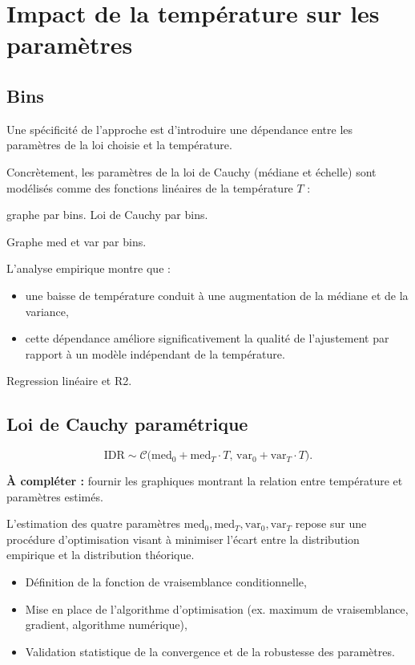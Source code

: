 \documentclass[11pt,a4paper,openright,twoside]{report}
\begin{document}
\section{Impact de la température sur les paramètres}
\subsection{Bins}
Une spécificité de l’approche est d’introduire une dépendance entre les paramètres de la loi choisie et la température.  

Concrètement, les paramètres de la loi de Cauchy (médiane et échelle) sont modélisés comme des fonctions linéaires de la température $T$ :  

graphe par bins. Loi de Cauchy par bins.

Graphe med et var par bins. 

L’analyse empirique montre que :  
\begin{itemize}
    \item une baisse de température conduit à une augmentation de la médiane et de la variance,
    \item cette dépendance améliore significativement la qualité de l’ajustement par rapport à un modèle indépendant de la température.
\end{itemize}

Regression linéaire et R2.

\subsection{Loi de Cauchy paramétrique}

\begin{equation}
    \text{IDR} \sim \mathcal{C}\big( \text{med}_0 + \text{med}_T \cdot T, \, \text{var}_0 + \text{var}_T \cdot T \big).
\end{equation}


\textbf{À compléter :} fournir les graphiques montrant la relation entre température et paramètres estimés.

L’estimation des quatre paramètres $\text{med}_0, \text{med}_T, \text{var}_0, \text{var}_T$ repose sur une procédure d’optimisation visant à minimiser l’écart entre la distribution empirique et la distribution théorique.  

\begin{itemize}
    \item Définition de la fonction de vraisemblance conditionnelle,
    \item Mise en place de l’algorithme d’optimisation (ex. maximum de vraisemblance, gradient, algorithme numérique),
    \item Validation statistique de la convergence et de la robustesse des paramètres.
\end{itemize}
\end{document}
